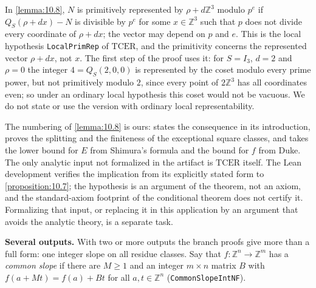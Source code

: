 In \cref{lemma:10.8}, $N$ is primitively represented by $ρ + dℤ^{3}$ modulo $p^{e}$ if $Q_{S}(ρ + dx) - N$ is divisible by $p^{e}$ for some $x ∈ ℤ^{3}$ such that $p$ does not divide every coordinate of $ρ + dx$; the vector may depend on $p$ and $e$. This is the local hypothesis \texttt{LocalPrimRep} of $\mathrm{TCER}$, and the primitivity concerns the represented vector $ρ + dx$, not $x$. The first step of the proof uses it: for $S = I_{3}$, $d = 2$ and $ρ = 0$ the integer $4 = Q_{S}(2, 0, 0)$ is represented by the coset modulo every prime power, but not primitively modulo $2$, since every point of $2ℤ^{3}$ has all coordinates even; so under an ordinary local hypothesis this coset would not be vacuous. We do not state or use the version with ordinary local representability.

The numbering of \cref{lemma:10.8} is ours: \cite{KK26} states the consequence in its introduction, proves the splitting and the finiteness of the exceptional square classes, and takes the lower bound for $E$ from Shimura's formula and the bound for $f$ from Duke. The only analytic input not formalized in the artifact is $\mathrm{TCER}$ itself. The Lean development verifies the implication from its explicitly stated form to \cref{proposition:10.7}; the hypothesis is an argument of the theorem, not an axiom, and the standard-axiom footprint of the conditional theorem does not certify it. Formalizing that input, or replacing it in this application by an argument that avoids the analytic theory, is a separate task.

\textbf{Several outputs.} With two or more outputs the branch proofs give more than a full form: one integer slope on all residue classes. Say that $f : ℤ^{n} → ℤ^{m}$ has a \emph{common slope} if there are $M ≥ 1$ and an integer $m × n$ matrix $B$ with $f(a + Mt) = f(a) + Bt$ for all $a, t ∈ ℤ^{n}$ (\texttt{CommonSlopeIntNF}).


